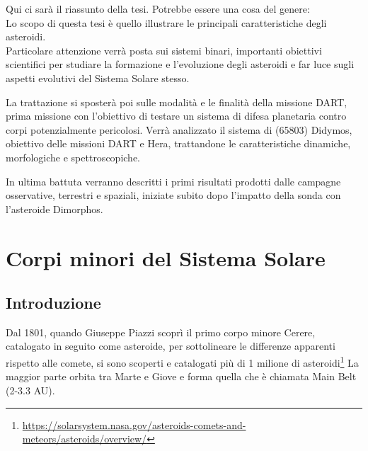 \documentclass[a4paper,11pt,openright]{book}
\newenvironment{abstract}%
{\cleardoublepage%
\thispagestyle{empty}%
\null \vfill
\begin{center}%
\Huge \bfseries \abstractname 
\end{center}}%
{\vfill\null}
\begin{document}
\begin{abstract}    
Qui ci sarà il riassunto della tesi. Potrebbe essere una cosa del genere:\\
Lo scopo di questa tesi è quello illustrare le principali caratteristiche degli asteroidi.\\
Particolare attenzione verrà posta sui sistemi binari, importanti obiettivi scientifici per studiare la formazione e l'evoluzione degli asteroidi e far luce sugli aspetti evolutivi del Sistema Solare stesso.

La trattazione si sposterà poi sulle modalità e le finalità della missione DART, prima missione con l'obiettivo di testare un sistema di difesa planetaria contro corpi potenzialmente pericolosi. Verrà analizzato il sistema di (65803) Didymos, obiettivo delle missioni DART e Hera, trattandone le caratteristiche dinamiche, morfologiche e spettroscopiche.

In ultima battuta verranno descritti i primi risultati prodotti dalle campagne osservative, terrestri e spaziali, iniziate subito dopo l'impatto della sonda con l'asteroide Dimorphos.



\end{abstract}



\tableofcontents

\listoftables

\listoffigures


\mainmatter

\chapter{Corpi minori del Sistema Solare}\label{ch:ch_1}

\section{Introduzione}

Dal 1801, quando Giuseppe Piazzi scoprì il primo corpo minore Cerere, catalogato in seguito come asteroide, per sottolineare le differenze apparenti rispetto alle comete, si sono scoperti e catalogati più di 1 milione di asteroidi\footnote{\href{https://solarsystem.nasa.gov/asteroids-comets-and-meteors/asteroids/overview/}{https://solarsystem.nasa.gov/asteroids-comets-and-meteors/asteroids/overview/}} La maggior parte orbita tra Marte e Giove e forma quella che è chiamata Main Belt (2-3.3 AU).
\end{document}

